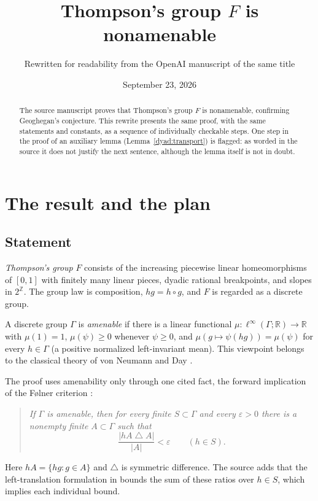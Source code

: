\documentclass[11pt]{article}
\title{Thompson's group \(F\) is nonamenable}
\author{Rewritten for readability from the OpenAI manuscript of the same title}
\date{September 23, 2026}
\newcommand{\R}{\mathbb R}
\newcommand{\Z}{\mathbb Z}
\theoremstyle{definition}
\numberwithin{equation}{section}
\begin{document}
\maketitle
\begin{abstract}
The source manuscript proves that Thompson's group \(F\) is nonamenable,
confirming Geoghegan's conjecture. This rewrite presents the same proof,
with the same statements and constants, as a sequence of individually
checkable steps. One step in the proof of an auxiliary lemma
(Lemma~\ref{dyad:transport}) is flagged: as worded in the source it does
not justify the next sentence, although the lemma itself is not in doubt.
\end{abstract}

\section{The result and the plan}
\label{sec:introduction}

\subsection{Statement}

\emph{Thompson's group} \(F\) consists of the increasing piecewise linear
homeomorphisms of \([0,1]\) with finitely many linear pieces, dyadic
rational breakpoints, and slopes in \(2^{\Z}\). The group law is
composition, \(hg=h\circ g\), and \(F\) is regarded as a discrete group.

A discrete group \(\Gamma\) is \emph{amenable} if there is a linear
functional \(\mu:\ell^\infty(\Gamma;\R)\to\R\) with \(\mu(1)=1\),
\(\mu(\psi)\ge0\) whenever \(\psi\ge0\), and
\(\mu(g\mapsto\psi(hg))=\mu(\psi)\) for every \(h\in\Gamma\)
(a positive normalized left-invariant mean). This viewpoint belongs to the
classical theory of von Neumann and Day \cite{vonNeumann1929,Day1957}.

The proof uses amenability only through one cited fact, the forward
implication of the F\o lner criterion \cite{Folner1955}:

\begin{quote}
\emph{If \(\Gamma\) is amenable, then for every finite \(S\subset\Gamma\)
and every \(\varepsilon>0\) there is a nonempty finite \(A\subset\Gamma\)
such that}
\begin{equation}\label{eq:folner}
  \frac{|hA\mathbin{\triangle}A|}{|A|}<\varepsilon
  \qquad(h\in S).
\end{equation}
\end{quote}
Here \(hA=\{hg:g\in A\}\) and \(\triangle\) is symmetric difference. The
source adds that the left-translation formulation in
\cite[Theorem~1.2]{Moore2013} bounds the sum of these ratios over
\(h\in S\), which implies each individual bound.
\end{document}
